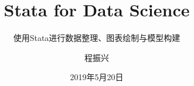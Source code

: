 \documentclass[cn,fancy,blue,11pt]{elegantbook}
\title{Stata for Data Science}
\subtitle{使用Stata进行数据整理、图表绘制与模型构建}
\author{程振兴}
\institute{https://czxa.top}
\date{2019年5月20日}
\begin{document}
\maketitle
\tableofcontents

\mainmatter
\hypersetup{pageanchor=true}









\nocite{ggplot2, R-base, R-bookdown, R-knitr, R-rmarkdown, xie2015, r4ds, stata, github,neat,haven,stata4ds, stcolor,cuse,finance,dict,stata2docx,stata-colorscheme,plotplain,tidy,flower}

\end{document}
